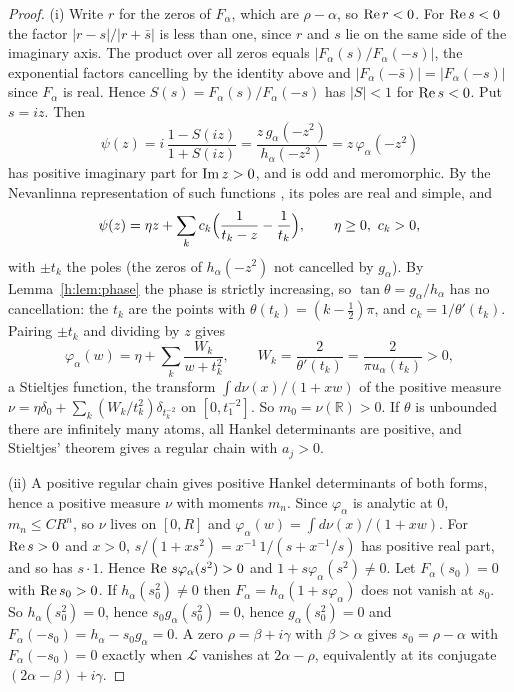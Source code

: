 \begin{proof}
(i) Write $r$ for the zeros of $F_\alpha$, which are $\rho-\alpha$, so $\operatorname{Re} r<0$. For $\operatorname{Re} s<0$ the factor $|r-s|/|r+\bar s|$ is less than one, since $r$ and $s$ lie on the same side of the imaginary axis. The product over all zeros equals $|F_\alpha(s)/F_\alpha(-s)|$, the exponential factors cancelling by the identity above and $|F_\alpha(-\bar s)|=|F_\alpha(-s)|$ since $F_\alpha$ is real. Hence $S(s)=F_\alpha(s)/F_\alpha(-s)$ has $|S|<1$ for $\operatorname{Re} s<0$. Put $s=iz$. Then
\[
\psi(z)=i\,\frac{1-S(iz)}{1+S(iz)}=\frac{z\,g_\alpha(-z^2)}{h_\alpha(-z^2)}=z\,\varphi_\alpha(-z^2)
\]
has positive imaginary part for $\operatorname{Im} z>0$, and is odd and meromorphic. By the Nevanlinna representation of such functions \cite[Chapter~VII]{Levin64}, its poles are real and simple, and
\[
\psi(z)=\eta z+\sum_k c_k\Bigl(\frac{1}{t_k-z}-\frac1{t_k}\Bigr),\qquad \eta\ge0,\ c_k>0,
\]
with $\pm t_k$ the poles (the zeros of $h_\alpha(-z^2)$ not cancelled by $g_\alpha$). By Lemma~\ref{h:lem:phase} the phase is strictly increasing, so $\tan\theta=g_\alpha/h_\alpha$ has no cancellation: the $t_k$ are the points with $\theta(t_k)=(k-\frac12)\pi$, and $c_k=1/\theta'(t_k)$. Pairing $\pm t_k$ and dividing by $z$ gives
\[
\varphi_\alpha(w)=\eta+\sum_k\frac{W_k}{w+t_k^2},\qquad W_k=\frac{2}{\theta'(t_k)}=\frac{2}{\pi u_\alpha(t_k)}>0 ,
\]
a Stieltjes function, the transform $\int d\nu(x)/(1+xw)$ of the positive measure $\nu=\eta\delta_0+\sum_k(W_k/t_k^2)\delta_{t_k^{-2}}$ on $[0,t_1^{-2}]$. So $m_0=\nu(\mathbb R)>0$. If $\theta$ is unbounded there are infinitely many atoms, all Hankel determinants are positive, and Stieltjes' theorem \cite{Stieltjes94} gives a regular chain with $a_j>0$.

(ii) A positive regular chain gives positive Hankel determinants of both forms, hence a positive measure $\nu$ with moments $m_n$. Since $\varphi_\alpha$ is analytic at $0$, $m_n\le CR^n$, so $\nu$ lives on $[0,R]$ and $\varphi_\alpha(w)=\int d\nu(x)/(1+xw)$. For $\operatorname{Re} s>0$ and $x>0$, $s/(1+xs^2)=x^{-1}\,1/(s+x^{-1}/s)$ has positive real part, and so has $s\cdot1$. Hence $\operatorname{Re}\,s\varphi_\alpha(s^2)>0$ and $1+s\varphi_\alpha(s^2)\ne0$. Let $F_\alpha(s_0)=0$ with $\operatorname{Re} s_0>0$. If $h_\alpha(s_0^2)\ne0$ then $F_\alpha=h_\alpha(1+s\varphi_\alpha)$ does not vanish at $s_0$. So $h_\alpha(s_0^2)=0$, hence $s_0g_\alpha(s_0^2)=0$, hence $g_\alpha(s_0^2)=0$ and $F_\alpha(-s_0)=h_\alpha-s_0g_\alpha=0$. A zero $\rho=\beta+i\gamma$ with $\beta>\alpha$ gives $s_0=\rho-\alpha$ with $F_\alpha(-s_0)=0$ exactly when $\mathcal L$ vanishes at $2\alpha-\rho$, equivalently at its conjugate $(2\alpha-\beta)+i\gamma$.
\end{proof}

